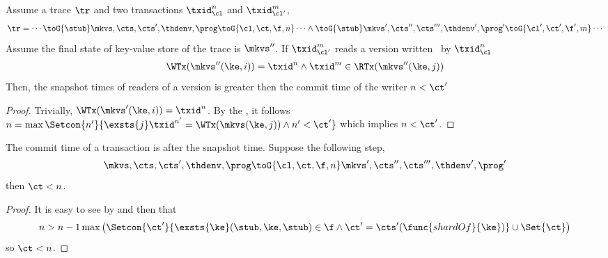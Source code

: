 \begin{lemma}
    \label{lem:clock-si-reader-greater-than-writer}
    Assume a trace \( \tr \) and two transactions \( \txid_{\cl}^n\) and \( \txid_{\cl'}^m \),
        \[
            \begin{array}{@{}l@{}}
                \tr = \cdots \toG{\stub} \mkvs,\cts,\cts',\thdenv, \prog \toG{\cl,\ct,\f,n} \cdots \land
                \toG{\stub} \mkvs',\cts'',\cts''',\thdenv', \prog' \toG{\cl',\ct',\f',m} \cdots
            \end{array}
        \]
    Assume the final state of key-value store of the trace is \( \mkvs'' \).
    If  \( \txid_{\cl'}^m \) reads a version written \ by \( \txid_{\cl}^n\)
    \[
        \begin{array}{@{}l@{}}
            \WTx(\mkvs''(\ke,i)) = \txid^n 
            \land \txid^m \in \RTx(\mkvs''(\ke,j))
        \end{array}
    \]
    Then, the snapshot times of readers of a version is greater then the commit time of the writer \( n < \ct' \)
\end{lemma}
\begin{proof}
    Trivially, \( \WTx(\mkvs'(\ke,i)) = \txid^n \).
    By the , it follows \( n  = \max\Setcon{n'}{ \exsts{j} \txid^{n'} = \WTx(\mkvs(\ke, j)) \land n' < \ct' } \) which implies \( n < \ct' \).
\end{proof}


\begin{lemma}
    \label{lem:commit-after-snapshot-time}
    The commit time of a transaction is after the snapshot time.
    Suppose the following step,
    \[
        \mkvs,\cts,\cts',\thdenv, \prog \toG{\cl,\ct,\f,n} \mkvs',\cts'',\cts''',\thdenv', \prog'
    \]
    then \( \ct < n \).
\end{lemma}
\begin{proof}
    It is easy to see by  and then  that 
    \[
        n > n - 1 \max\left( \Setcon{\ct'}{\exsts{\ke} (\stub, \ke, \stub) \in \f \land \ct' = \cts'(\func{shardOf}{\ke})} \cup \Set{\ct} \right)
    \]
    so \( \ct < n \).
\end{proof}


